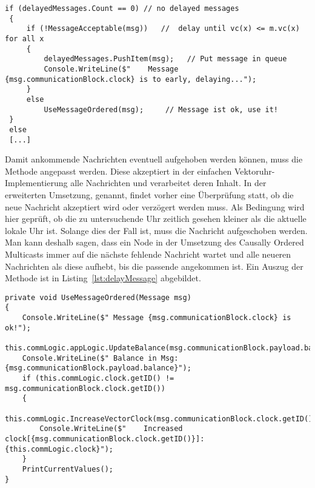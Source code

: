 \begin{lstlisting}[label=lst:delayMessage,
language=sharpc,
float=ht,
firstnumber=1,
captionpos=b,
caption={Auszug aus der Methode \code{HandleCommunicationMessageOrdered()}. Hier wird geprüft, ob schon aufgeschobenen Nachrichten vorhanden sind und ob die angekommende akzeptiert werden kann.}]
 if (delayedMessages.Count == 0) // no delayed messages
 {
	 if (!MessageAcceptable(msg))   //  delay until vc(x) <= m.vc(x) for all x
	 {
		 delayedMessages.PushItem(msg);   // Put message in queue
		 Console.WriteLine($"    Message {msg.communicationBlock.clock} is to early, delaying...");
	 }
	 else
		 UseMessageOrdered(msg);     // Message ist ok, use it!
 }
 else
 [...]
\end{lstlisting}

Damit ankommende Nachrichten eventuell aufgehoben werden können, muss die Methode  angepasst werden. Diese akzeptiert in der einfachen Vektoruhr-Implementierung alle Nachrichten und verarbeitet deren Inhalt. In der erweiterten Umsetzung,  genannt, findet vorher eine Überprüfung statt, ob die neue Nachricht akzeptiert wird oder verzögert werden muss. Als Bedingung wird hier geprüft, ob die zu untersuchende Uhr zeitlich gesehen kleiner als die aktuelle lokale Uhr ist. Solange dies der Fall ist, muss die Nachricht aufgeschoben werden. Man kann deshalb sagen, dass ein Node in der Umsetzung des Causally Ordered Multicasts immer auf die nächste fehlende Nachricht wartet und alle neueren Nachrichten als diese aufhebt, bis die passende angekommen ist. Ein Auszug der Methode ist in Listing~\ref{lst:delayMessage} abgebildet.

\begin{lstlisting}[label=lst:useMessage,
language=sharpc,
captionpos=b,
float=ht,
firstnumber=1,
caption={Verarbeitung einer akzeptierten Nachricht.}]
private void UseMessageOrdered(Message msg)
{
	Console.WriteLine($" Message {msg.communicationBlock.clock} is ok!");
	this.commLogic.appLogic.UpdateBalance(msg.communicationBlock.payload.balance);
	Console.WriteLine($" Balance in Msg: {msg.communicationBlock.payload.balance}");
	if (this.commLogic.clock.getID() != msg.communicationBlock.clock.getID())
	{
		this.commLogic.IncreaseVectorClock(msg.communicationBlock.clock.getID());
		Console.WriteLine($"    Increased clock[{msg.communicationBlock.clock.getID()}]: {this.commLogic.clock}");
	}
	PrintCurrentValues();
}
\end{lstlisting}

